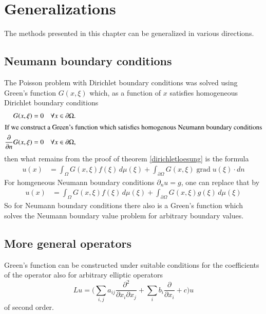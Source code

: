 %
%
%
\section{Generalizations}
The methods presented in this chapter can be generalized in various
directions.

\subsection{Neumann boundary conditions}
The Poisson problem with Dirichlet boundary conditions was solved
using Green's function
$G(x,\xi)$ which, as a function of $x$ satisfies homogeneous
Dirichlet boundary conditions
\begin{align*}
G(x,\xi)
&=
0\quad\forall x\in\partial\Omega.
\\
\intertext{If we construct a Green's function which satisfies homogenous 
Neumann boundary conditions}
\frac{\partial}{\partial n}G(x,\xi)
&=
0\quad\forall x\in\partial\Omega,
\end{align*}
then what remains from the proof of theorem \ref{dirichletloesung}
is the formula
\begin{align*}
u(x)&=\int_{\Omega}G(x,\xi)f(\xi)\,d\mu(\xi)+\int_{\partial\Omega}G(x,\xi)\operatorname{grad}u(\xi)\cdot dn
\end{align*}
For homgeneous Neumann boundary conditions
$\partial_n u=g$, one can replace that by
\begin{align*}
u(x)&=\int_{\Omega}G(x,\xi)f(\xi)\,d\mu(\xi)+\int_{\partial\Omega}G(x,\xi)g(\xi)\,d\mu(\xi)
\end{align*}
So for Neumann boundary conditions there also is a Green's function
which solves the Neumann boundary value problem for arbitrary 
boundary values.

\subsection{More general operators}
Green's function can be constructed under suitable conditions
for the coefficients of the operator also for arbitrary
elliptic operators
\[
Lu=\biggl(\sum_{i,j}a_{ij}\frac{\partial^2}{\partial x_i\partial x_j}
+\sum_ib_i\frac{\partial}{\partial x_i} +c\biggr)u
\]
of second order.

